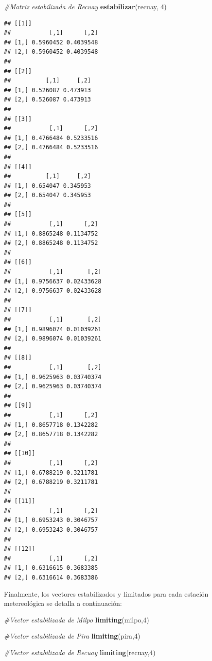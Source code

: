 \documentclass[]{article}
\newenvironment{Shaded}{\begin{snugshade}}{\end{snugshade}}
\newcommand{\CommentTok}[1]{\textcolor[rgb]{0.56,0.35,0.01}{\textit{#1}}}
\newcommand{\DecValTok}[1]{\textcolor[rgb]{0.00,0.00,0.81}{#1}}
\newcommand{\KeywordTok}[1]{\textcolor[rgb]{0.13,0.29,0.53}{\textbf{#1}}}
\newcommand{\NormalTok}[1]{#1}
\begin{document}
\begin{Shaded}
\begin{Highlighting}[]
\CommentTok{#Matriz estabilizada de Recuay}
\KeywordTok{estabilizar}\NormalTok{(recuay, }\DecValTok{4}\NormalTok{)}
\end{Highlighting}
\end{Shaded}

\begin{verbatim}
## [[1]]
##           [,1]      [,2]
## [1,] 0.5960452 0.4039548
## [2,] 0.5960452 0.4039548
## 
## [[2]]
##          [,1]     [,2]
## [1,] 0.526087 0.473913
## [2,] 0.526087 0.473913
## 
## [[3]]
##           [,1]      [,2]
## [1,] 0.4766484 0.5233516
## [2,] 0.4766484 0.5233516
## 
## [[4]]
##          [,1]     [,2]
## [1,] 0.654047 0.345953
## [2,] 0.654047 0.345953
## 
## [[5]]
##           [,1]      [,2]
## [1,] 0.8865248 0.1134752
## [2,] 0.8865248 0.1134752
## 
## [[6]]
##           [,1]       [,2]
## [1,] 0.9756637 0.02433628
## [2,] 0.9756637 0.02433628
## 
## [[7]]
##           [,1]       [,2]
## [1,] 0.9896074 0.01039261
## [2,] 0.9896074 0.01039261
## 
## [[8]]
##           [,1]       [,2]
## [1,] 0.9625963 0.03740374
## [2,] 0.9625963 0.03740374
## 
## [[9]]
##           [,1]      [,2]
## [1,] 0.8657718 0.1342282
## [2,] 0.8657718 0.1342282
## 
## [[10]]
##           [,1]      [,2]
## [1,] 0.6788219 0.3211781
## [2,] 0.6788219 0.3211781
## 
## [[11]]
##           [,1]      [,2]
## [1,] 0.6953243 0.3046757
## [2,] 0.6953243 0.3046757
## 
## [[12]]
##           [,1]      [,2]
## [1,] 0.6316615 0.3683385
## [2,] 0.6316614 0.3683386
\end{verbatim}

Finalmente, los vectores estabilizados y limitados para cada estación
metereológica se detalla a continuación:

\begin{Shaded}
\begin{Highlighting}[]
\CommentTok{#Vector estabilizada de Milpo}
\KeywordTok{limiting}\NormalTok{(milpo,}\DecValTok{4}\NormalTok{)}
\end{Highlighting}
\end{Shaded}

\begin{Shaded}
\begin{Highlighting}[]
\CommentTok{#Vector estabilizada de Pira}
\KeywordTok{limiting}\NormalTok{(pira,}\DecValTok{4}\NormalTok{)}
\end{Highlighting}
\end{Shaded}

\begin{Shaded}
\begin{Highlighting}[]
\CommentTok{#Vector estabilizada de Recuay}
\KeywordTok{limiting}\NormalTok{(recuay,}\DecValTok{4}\NormalTok{)}
\end{Highlighting}
\end{Shaded}
\end{document}
